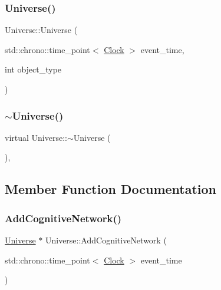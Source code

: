 \mbox{\label{classUniverse_a03af7455263d3028b55ca5dc93ebb6ba}} 
\subsubsection{\texorpdfstring{Universe()}{Universe()}\hspace{0.1cm}{\footnotesize\ttfamily [3/3]}}
{\footnotesize\ttfamily Universe\+::\+Universe (\begin{DoxyParamCaption}\item[{std\+::chrono\+::time\+\_\+point$<$ \mbox{\hyperlink{universe_8h_a0ef8d951d1ca5ab3cfaf7ab4c7a6fd80}{Clock}} $>$}]{event\+\_\+time,  }\item[{int}]{object\+\_\+type }\end{DoxyParamCaption})\hspace{0.3cm}{\ttfamily [inline]}}

\mbox{\label{classUniverse_ad4d90f6f2727992762c6b409d3d3d228}} 
\subsubsection{\texorpdfstring{$\sim$\+Universe()}{~Universe()}}
{\footnotesize\ttfamily virtual Universe\+::$\sim$\+Universe (\begin{DoxyParamCaption}{ }\end{DoxyParamCaption})\hspace{0.3cm}{\ttfamily [inline]}, {\ttfamily [virtual]}}



\subsection{Member Function Documentation}
\mbox{\label{classUniverse_ab682307c963836cd81b35b5604bd7064}} 
\subsubsection{\texorpdfstring{Add\+Cognitive\+Network()}{AddCognitiveNetwork()}}
{\footnotesize\ttfamily \mbox{\hyperlink{classUniverse}{Universe}} $\ast$ Universe\+::\+Add\+Cognitive\+Network (\begin{DoxyParamCaption}\item[{std\+::chrono\+::time\+\_\+point$<$ \mbox{\hyperlink{universe_8h_a0ef8d951d1ca5ab3cfaf7ab4c7a6fd80}{Clock}} $>$}]{event\+\_\+time }\end{DoxyParamCaption})}

